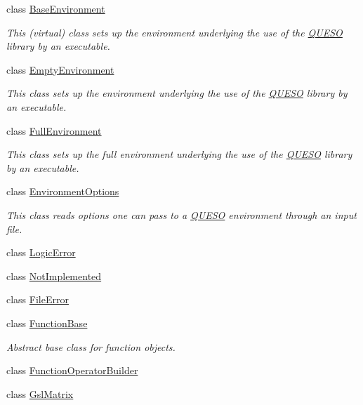 \begin{DoxyCompactItemize}
class \hyperlink{class_q_u_e_s_o_1_1_base_environment}{Base\-Environment}
\begin{DoxyCompactList}\small\item\em This (virtual) class sets up the environment underlying the use of the \hyperlink{namespace_q_u_e_s_o}{Q\-U\-E\-S\-O} library by an executable. \end{DoxyCompactList}\item 
class \hyperlink{class_q_u_e_s_o_1_1_empty_environment}{Empty\-Environment}
\begin{DoxyCompactList}\small\item\em This class sets up the environment underlying the use of the \hyperlink{namespace_q_u_e_s_o}{Q\-U\-E\-S\-O} library by an executable. \end{DoxyCompactList}\item 
class \hyperlink{class_q_u_e_s_o_1_1_full_environment}{Full\-Environment}
\begin{DoxyCompactList}\small\item\em This class sets up the full environment underlying the use of the \hyperlink{namespace_q_u_e_s_o}{Q\-U\-E\-S\-O} library by an executable. \end{DoxyCompactList}\item 
class \hyperlink{class_q_u_e_s_o_1_1_environment_options}{Environment\-Options}
\begin{DoxyCompactList}\small\item\em This class reads options one can pass to a \hyperlink{namespace_q_u_e_s_o}{Q\-U\-E\-S\-O} environment through an input file. \end{DoxyCompactList}\item 
class \hyperlink{class_q_u_e_s_o_1_1_logic_error}{Logic\-Error}
\item 
class \hyperlink{class_q_u_e_s_o_1_1_not_implemented}{Not\-Implemented}
\item 
class \hyperlink{class_q_u_e_s_o_1_1_file_error}{File\-Error}
\item 
class \hyperlink{class_q_u_e_s_o_1_1_function_base}{Function\-Base}
\begin{DoxyCompactList}\small\item\em Abstract base class for function objects. \end{DoxyCompactList}\item 
class \hyperlink{class_q_u_e_s_o_1_1_function_operator_builder}{Function\-Operator\-Builder}
\item 
class \hyperlink{class_q_u_e_s_o_1_1_gsl_matrix}{Gsl\-Matrix}

\end{DoxyCompactItemize}
